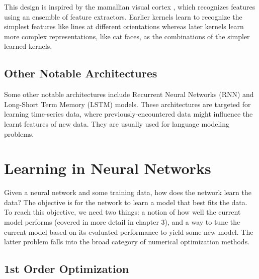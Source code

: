 \documentclass[paper=a4, fontsize=12pt]{scrartcl} %
\numberwithin{equation}{section} %
\numberwithin{figure}{section} %
\numberwithin{table}{section} %
\begin{document}
This design is inspired by the mamallian visual cortex \cite{cortex}, which recognizes features using an ensemble of feature extractors. Earlier kernels learn to recognize 
the simplest features like lines at different orientations whereas later kernels learn more complex representations, like cat faces, as the combinations of the simpler learned kernels.

\subsection{Other Notable Architectures} %

Some other notable architectures include Recurrent Neural Networks (RNN) and Long-Short Term Memory (LSTM) models. These architectures are targeted for learning time-series data, where previously-encountered 
data might influence the learnt features of new data. They are usually used for language modeling problems.

\pagebreak


\section{Learning in Neural Networks}

Given a neural network and some training data, how does the network learn the data? 
The objective is for the network to learn a model that best fits the data. To reach this objective, we need 
two things: a notion of how well the current model performs (covered in more detail in chapter 3), and a way to tune
the current model based on its evaluated performance to yield some new model. The latter problem falls into the 
broad category of numerical optimization methods.


\subsection{1st Order Optimization}
\end{document}
